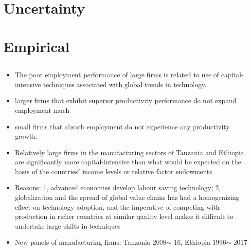 \documentclass[10pt]{article} %
\begin{document}
    \subsection{\cite{KletteKortum2004}}

    \subsection{\cite{Melitz2003}}
\section{Uncertainty}
    \subsection{\cite{ArellanoBaiKehoe2019}}
\section{Empirical}

    \subsection{\cite{DiaoElllisMcMillanRodrik2021}}
    \begin{itemize}
        \item The poor employment performance of large firms is related to use of capital-intensive techniques associated with global trends in technology.
        \item larger firms that exhibit superior productivity performance do not expand employment much
        \item small firms that absorb employment do not experience any productivity growth. 
        \item Relatively large firms in the manufacturing sectors of Tanzania and Ethiopia are significantly more capital-intensive than what would be expected on the basis of the countries$\prime$ income levels or relative factor endowments
        \item Reasons: 1, advanced economies develop labour saving technology; 2, globalization and the spread of global value chains has had a homogenizing effect on technology adoption, and the imperative of competing with production in richer countries at similar quality level makes it difficult to undertake large shifts in techniques
        \item New panels of manufacturing firms: Tanzania 2008$\sim$ 16, Ethiopia 1996$\sim$ 2017
    \end{itemize}
\end{document}
